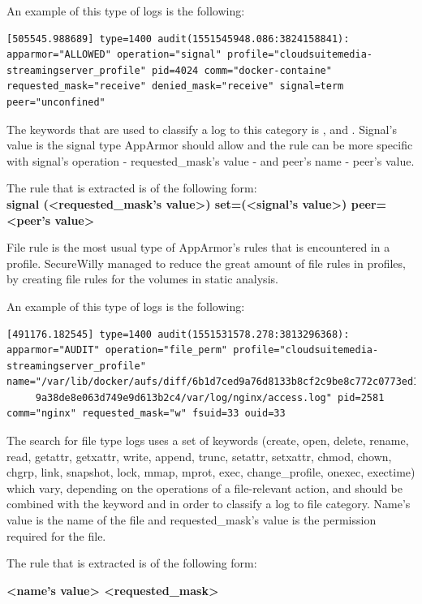 \begin{description}[style=nextline]
An example of this type of logs is the following:

\begin{lstlisting}[style=dockercommands]
[505545.988689] type=1400 audit(1551545948.086:3824158841): apparmor="ALLOWED" operation="signal" profile="cloudsuitemedia-streamingserver_profile" pid=4024 comm="docker-containe" requested_mask="receive" denied_mask="receive" signal=term peer="unconfined"
\end{lstlisting}

The keywords that are used to classify a log to this category is ,  and . Signal's value is the signal type AppArmor should allow and the rule can be more specific with signal's operation - requested\_mask's value - and peer's name  - peer's value.

The rule that is extracted is of the following form:\\\textbf{signal (\textless requested\_mask's value\textgreater) set=(\textless signal's value\textgreater) peer=\textless peer's value\textgreater}

\item[File rules]

File rule is the most usual type of AppArmor's rules that is encountered in a profile. SecureWilly managed to reduce the great amount of file rules in profiles, by creating file rules for the volumes in static analysis. 

An example of this type of logs is the following:

\begin{lstlisting}[style=dockercommands]
[491176.182545] type=1400 audit(1551531578.278:3813296368): apparmor="AUDIT" operation="file_perm" profile="cloudsuitemedia-streamingserver_profile" name="/var/lib/docker/aufs/diff/6b1d7ced9a76d8133b8cf2c9be8c772c0773ed1
	 9a38de8e063d749e9d613b2c4/var/log/nginx/access.log" pid=2581 comm="nginx" requested_mask="w" fsuid=33 ouid=33
\end{lstlisting}

The search for file type logs uses a set of keywords (create, open, delete, rename, read, getattr, getxattr, write, append, trunc, setattr, setxattr, chmod, chown, chgrp, link, snapshot, lock, mmap, mprot, exec, change\_profile, onexec, exectime) which vary, depending on the operations of a file-relevant action, and should be combined with the keyword  and  in order to classify a log to file category. Name's value is the name of the file and requested\_mask's value is the permission required for the file.

The rule that is extracted is of the following form:

\textbf{\textless name's value\textgreater{} \textless requested\_mask\textgreater}

\end{description}

